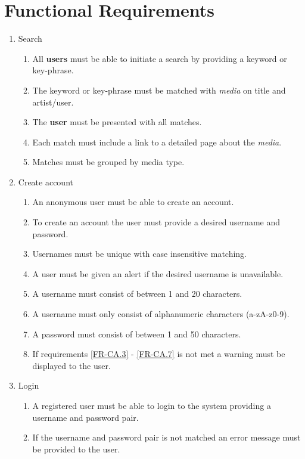 \documentclass[../report.tex]{subfiles}
\begin{document}
\section{Functional Requirements}

	\begin{enumerate}
		\item Search
			\begin{enumerate}
				\item All \textbf{users} must be able to initiate a search by providing a keyword or key-phrase.
				\item The keyword or key-phrase must be matched with \textit{media} on title and artist/user.
				\item The \textbf{user} must be presented with all matches.
				\item Each match must include a link to a detailed page about the \textit{media}.
				\item Matches must be grouped by media type. 
			\end{enumerate}
			
			
		\item Create account
			\begin{enumerate}
				\item An anonymous user must be able to create an account.
				\item To create an account the user must provide a desired username and password.
				
				\item Usernames must be unique with case insensitive matching. \label{FR-CA.3}
				\item A user must be given an alert if the desired username is unavailable.
				\item A username must consist of between 1 and 20 characters.
				\item A username must only consist of alphanumeric characters (a-zA-z0-9).
				
				\item A password must consist of between 1 and 50 characters. \label{FR-CA.7}
				\item If requirements \ref{FR-CA.3} - \ref{FR-CA.7} is not met a warning must be displayed to the user.
			\end{enumerate}
			
		
		\item Login
			\begin{enumerate}
				\item A registered user must be able to login to the system providing a username and password pair.
				\item If the username and password pair is not matched an error message must be provided to the user. 
			\end{enumerate}


\end{enumerate}
\end{document}
